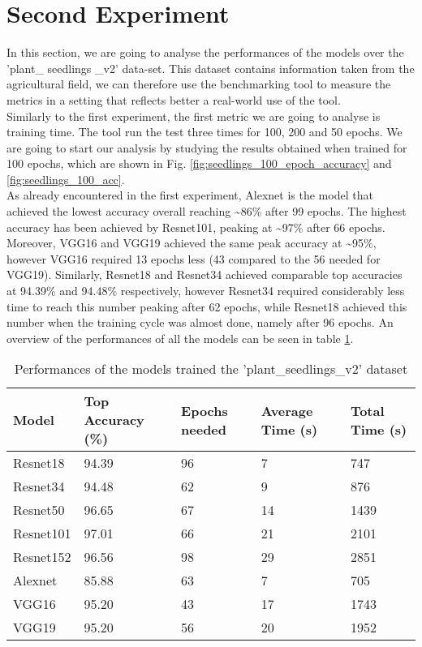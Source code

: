 \section{Second Experiment}
In this section, we are going to analyse the performances of the models over the 'plant\_ seedlings \_v2' data-set. This dataset contains information taken from the agricultural field, we can therefore use the benchmarking tool to measure the metrics in a setting that reflects better a real-world use of the tool. \\
Similarly to the first experiment, the first metric we are going to analyse is training time. The tool run the test three times for 100, 200 and 50 epochs. 
We are going to start our analysis by studying the results obtained when trained for 100 epochs, which are shown in Fig. \ref{fig:seedlings_100_epoch_accuracy} and \ref{fig:seedlings_100_acc}. \\
As already encountered in the first experiment, Alexnet is the model that achieved the lowest accuracy overall reaching \textasciitilde86\% after 99 epochs. The highest accuracy has been achieved by Resnet101, peaking at \textasciitilde97\% after 66 epochs. Moreover, VGG16 and VGG19 achieved the same peak accuracy at \textasciitilde95\%, however VGG16 required 13 epochs less (43 compared to the 56 needed for VGG19). Similarly, Resnet18 and Resnet34 achieved comparable top accuracies at  94.39\% and 94.48\% respectively, however Resnet34 required considerably less time to reach this number peaking after 62 epochs, while Resnet18 achieved this number when the training cycle was almost done, namely after 96 epochs. An overview of the performances of all the models can be seen in table \ref{tab:performances_seeds}. 
\begin{table}[htbp]
\centering
\begin{tabular}{ p{2cm} p{4cm} p{3cm} p{3cm} p{2cm}  }
 Model& Top Accuracy (\%) & Epochs needed &Average Time (s)&Total Time (s)\\
 \hline
Resnet18&94.39&96&7&747\\
Resnet34&94.48&62&9&876\\
Resnet50&96.65&67&14&1439\\
Resnet101&97.01&66&21&2101\\
Resnet152&96.56&98&29&2851\\
Alexnet&85.88&63&7&705\\
VGG16&95.20&43&17&1743\\
VGG19&95.20&56&20&1952\\
 \hline
\end{tabular}
\caption{Performances of the models trained the 'plant\_seedlings\_v2' dataset}
\label{tab:performances_seeds}
\end{table}\\



